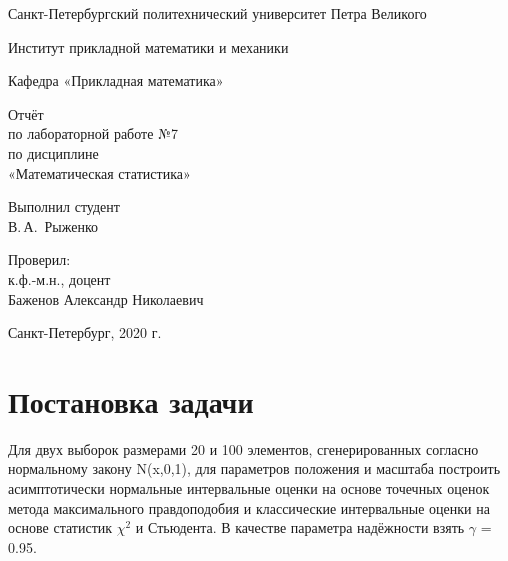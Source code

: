 \documentclass[12pt,a4paper]{scrartcl}
\begin{document}
\begin{titlepage}
  \begin{center}

    Санкт-Петербургский политехнический университет Петра Великого

    \vspace{0.25cm}
    
    Институт прикладной математики и механики
    
    Кафедра «Прикладная математика»
    \vfill

	\vspace{0.25cm}
	    Отчёт\\
	по лабораторной работе №7\\
	по дисциплине\\
	«Математическая статистика»

  \bigskip

\end{center}
\vfill

\newlength{\ML}
\hfill\begin{minipage}{0.4\textwidth}
  Выполнил студент\\ В.\,А.~Рыженко\\
\end{minipage}%
\bigskip

\hfill\begin{minipage}{0.4\textwidth}
  Проверил:\\
к.ф.-м.н., доцент\\
Баженов Александр Николаевич\\
\end{minipage}%
\vfill

\begin{center}
  Санкт-Петербург, 2020 г.
\end{center}
\end{titlepage}

\tableofcontents
\listoftables
\newpage

\section{Постановка задачи}

 Для двух выборок размерами 20 и 100 элементов, сгенерированных согласно нормальному закону N(x,0,1), для параметров положения и масштаба построить асимптотически нормальные интервальные оценки на основе точечных оценок метода максимального правдоподобия и классические интервальные оценки на основе статистик $\chi^{2}$ и Стьюдента. В качестве параметра надёжности взять $\gamma$ = 0.95.
\end{document}
